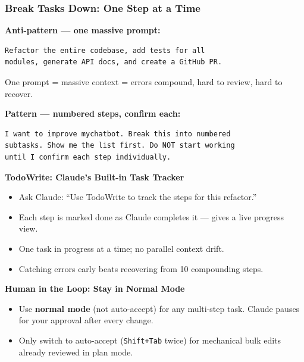 \begin{frame}[fragile]\frametitle{Break Tasks Down: One Step at a Time}
\textbf{Anti-pattern --- one massive prompt:}
\begin{lstlisting}
Refactor the entire codebase, add tests for all
modules, generate API docs, and create a GitHub PR.
\end{lstlisting}
One prompt = massive context = errors compound, hard to review, hard to recover.

\textbf{Pattern --- numbered steps, confirm each:}
\begin{lstlisting}
I want to improve mychatbot. Break this into numbered
subtasks. Show me the list first. Do NOT start working
until I confirm each step individually.
\end{lstlisting}

\textbf{TodoWrite: Claude's Built-in Task Tracker}
  \begin{itemize}
    \item Ask Claude: ``Use TodoWrite to track the steps for this refactor.''
    \item Each step is marked done as Claude completes it --- gives a live progress view.
    \item One task in progress at a time; no parallel context drift.
    \item Catching errors early beats recovering from 10 compounding steps.
  \end{itemize}

\textbf{Human in the Loop: Stay in Normal Mode}
  \begin{itemize}
    \item Use \textbf{normal mode} (not auto-accept) for any multi-step task. Claude pauses for your approval after every change.
    \item Only switch to auto-accept (\texttt{Shift+Tab} twice) for mechanical bulk edits already reviewed in plan mode.
  \end{itemize}
\end{frame}

